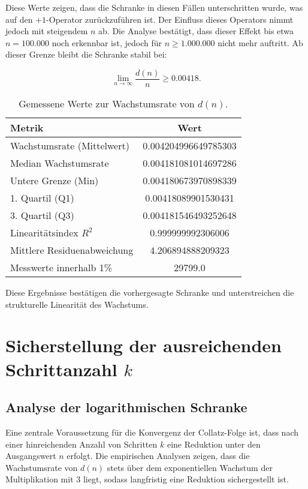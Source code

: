 \documentclass[a4paper,12pt]{article}
\begin{document}
Diese Werte zeigen, dass die Schranke in diesen Fällen unterschritten wurde, was auf den \(+1\)-Operator zurückzuführen ist. Der Einfluss dieses Operators nimmt jedoch mit steigendem \( n \) ab. Die Analyse bestätigt, dass dieser Effekt bis etwa \( n = 100.000 \) noch erkennbar ist, jedoch für \( n \geq 1.000.000 \) nicht mehr auftritt. Ab dieser Grenze bleibt die Schranke stabil bei:

\begin{equation}
    \lim_{n \to \infty} \frac{d(n)}{n} \geq 0.00418.
\end{equation}

\begin{table}[h]
    \centering
    \begin{tabular}{|l|c|}
        \hline
        \textbf{Metrik} & \textbf{Wert} \\
        \hline
        Wachstumsrate (Mittelwert) & 0.004204996649785303 \\
        Median Wachstumsrate & 0.004181081014697286 \\
        Untere Grenze (Min) & 0.004180673970898339 \\
        1. Quartil (Q1) & 0.00418089901530431 \\
        3. Quartil (Q3) & 0.004181546493252648 \\
        Linearitätsindex \( R^2 \) & 0.999999992306006 \\
        Mittlere Residuenabweichung & 4.206894888209323 \\
        Messwerte innerhalb 1\% & 29799.0 \\
        \hline
    \end{tabular}
    \caption{Gemessene Werte zur Wachstumsrate von \( d(n) \).}
\end{table}

Diese Ergebnisse bestätigen die vorhergesagte Schranke und unterstreichen die strukturelle Linearität des Wachstums.




\section{Sicherstellung der ausreichenden Schrittanzahl \( k \)}

\subsection{Analyse der logarithmischen Schranke}

Eine zentrale Voraussetzung für die Konvergenz der Collatz-Folge ist, dass nach einer hinreichenden Anzahl von Schritten \( k \) eine Reduktion unter den Ausgangswert \( n \) erfolgt. Die empirischen Analysen zeigen, dass die Wachstumsrate von \( d(n) \) stets über dem exponentiellen Wachstum der Multiplikation mit 3 liegt, sodass langfristig eine Reduktion sichergestellt ist.
\end{document}
